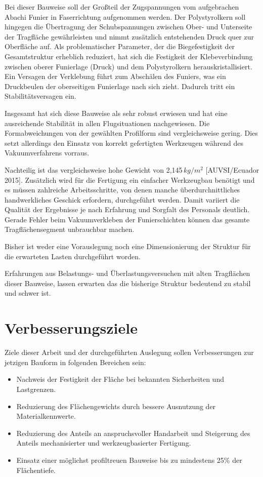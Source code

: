 Bei dieser Bauweise soll der Großteil der Zugspannungen vom aufgebrachen Abachi Funier in Faserrichtung aufgenommen werden. Der Polystyrolkern soll hingegen die Übertragung der Schubspannungen zwischen Ober- und Unterseite der Tragfläche gewährleisten und nimmt zusätzlich entstehenden Druck quer zur Oberfläche auf. Als problematischer Parameter, der die Biegefestigkeit der Gesamtstruktur erheblich reduziert, hat sich die Festigkeit der Klebeverbindung zwischen oberer Funierlage (Druck) und dem Polystyrolkern herauskristallisiert. Ein Versagen der Verklebung führt zum Abschälen des Funiers, was ein Druckbeulen der oberseitigen Funierlage nach sich zieht. Dadurch tritt ein Stabilitätsversagen ein.

Insgesamt hat sich diese Bauweise als sehr robust erwiesen und hat eine ausreichende Stabilität in allen Flugsituationen nachgewiesen.
Die Formabweichungen von der gewählten Profilform sind vergleichsweise gering. Dies setzt allerdings den Einsatz von korrekt gefertigten Werkzeugen während des Vakuumverfahrens vorraus. 

Nachteilig ist das vergleichsweise hohe Gewicht von 2,145\,$kg/m^2$ [AUVSI/Ecuador 2015].
Zusätzlich wird für die Fertigung ein einfacher Werkzeugbau benötigt und es müssen zahlreiche Arbeitsschritte, von denen manche überdurchnittliches handwerkliches Geschick erfordern, durchgeführt werden. Damit variiert die Qualität der Ergebnisse je nach Erfahrung und Sorgfalt des Personals deutlich. Gerade Fehler beim Vakuumverkleben der Funierschichten können das gesamte Tragflächensegment unbrauchbar machen. 

Bisher ist weder eine Vorauslegung noch eine Dimensionierung der Struktur für die erwarteten Lasten durchgeführt worden.

Erfahrungen aus Belastungs- und Überlastungsversuchen mit alten Tragflächen dieser Bauweise, lassen erwarten das die bisherige Struktur bedeutend zu stabil und schwer ist. 

\clearpage

\section{Verbesserungsziele}

Ziele dieser Arbeit und der durchgeführten Auslegung sollen Verbesserungen zur jetzigen Bauform in folgenden Bereichen sein:
\begin{itemize}
    \item Nachweis der Festigkeit der Fläche bei bekannten Sicherheiten und Lastgrenzen.
    \item Reduzierung des Flächengewichts durch bessere Ausnutzung der Materialkennwerte.
    \item Reduzierung des Anteils an anspruchsvoller Handarbeit und Steigerung des Anteils mechanisierter und werkzeugbasierter Fertigung.
    \item Einsatz einer möglichst profiltreuen Bauweise bis zu mindestens 25\% der Flächentiefe.
    \label{lst:Verbesserungsziele}
\end{itemize}


